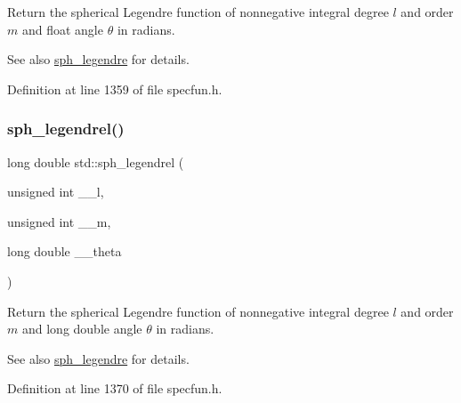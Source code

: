 Return the spherical Legendre function of nonnegative integral degree $ l $ and order $ m $ and float angle $ \theta $ in radians.

\begin{DoxySeeAlso}{See also}
\hyperlink{group__cxx17__math__spec__func_gacef0d41a7ce572a9ace3437498794ed0}{sph\+\_\+legendre} for details. 
\end{DoxySeeAlso}


Definition at line 1359 of file specfun.\+h.

\mbox{\label{group__cxx17__math__spec__func_ga2f6618dea1847f09fd67f3c974c1910d}} 
\subsubsection{\texorpdfstring{sph\+\_\+legendrel()}{sph\_legendrel()}}
{\footnotesize\ttfamily long double std\+::sph\+\_\+legendrel (\begin{DoxyParamCaption}\item[{unsigned int}]{\+\_\+\+\_\+l,  }\item[{unsigned int}]{\+\_\+\+\_\+m,  }\item[{long double}]{\+\_\+\+\_\+theta }\end{DoxyParamCaption})\hspace{0.3cm}{\ttfamily [inline]}}

Return the spherical Legendre function of nonnegative integral degree $ l $ and order $ m $ and {\ttfamily long double} angle $ \theta $ in radians.

\begin{DoxySeeAlso}{See also}
\hyperlink{group__cxx17__math__spec__func_gacef0d41a7ce572a9ace3437498794ed0}{sph\+\_\+legendre} for details. 
\end{DoxySeeAlso}


Definition at line 1370 of file specfun.\+h.

\mbox{\label{group__cxx17__math__spec__func_ga01cdd716aaca8ff3c08f307800fd5220}} 
